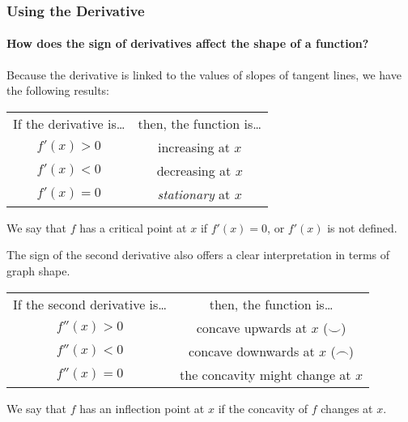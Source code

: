 \documentclass[9pt,xcolor=x11names,compress]{beamer}
\begin{document}
\begin{frame}\frametitle{Using the Derivative}
\framesubtitle{How does the sign of derivatives affect the shape of a function?}
Because the derivative is linked to the values of slopes of tangent lines, we have the following results:
\begin{center}
	\begin{tabular}{c||c}	
		\rowcolor{DeepSkyBlue4}	
		If the derivative is\dots & then, the function is\dots \\
		$f'(x)>0$ & increasing at $x$ \\
		$f'(x)<0$ & decreasing at $x$ \\
		$f'(x)=0$ & \emph{stationary} at $x$
	\end{tabular}	
\end{center}
\pause We say that $f$ has a \alert{critical point} at $x$ if $f'(x)=0$, or $f'(x)$ is not defined.

\pause The sign of the second derivative also offers a clear interpretation in terms of graph shape.
\begin{center}
	\begin{tabular}{c||c}	
		\rowcolor{DeepSkyBlue4}	
		If the second derivative is\dots & then, the function is\dots \\
		$f''(x)>0$ & concave upwards at $x$ ($\smile$) \\
		$f''(x)<0$ & concave downwards at $x$ ($\frown$) \\
		$f''(x)=0$ & the concavity might change at $x$
	\end{tabular}
\end{center}
\pause We say that $f$ has an \alert{inflection point} at $x$ if the concavity of $f$ changes at $x$.
\end{frame}
\end{document}
